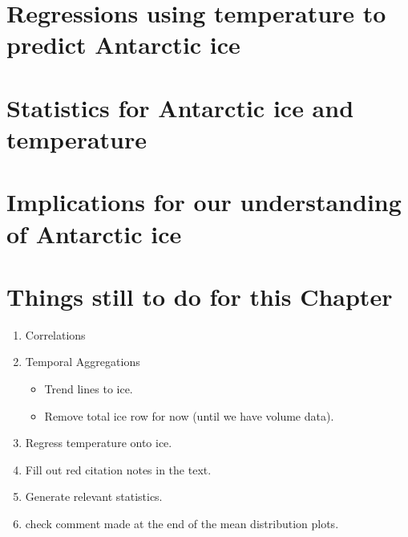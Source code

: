 \documentclass[../main.tex]{subfiles}
\begin{document}
\section[Regressions]{Regressions using temperature to predict Antarctic ice}
\label{sec:regressions_temp_ice}

\section[Statistics]{Statistics for Antarctic ice and temperature}

\section[Implications]{Implications for our understanding of Antarctic ice          }

\pagebreak
\section*{Things still to do for this Chapter}
\begin{enumerate}
    \item Correlations
    \item Temporal Aggregations
    \begin{itemize}
        \item Trend lines to ice.
        \item Remove total ice row for now (until we have volume data).
    \end{itemize}
    \item Regress temperature onto ice.
    \item Fill out red citation notes in the text.
    \item Generate relevant statistics.
    \item check comment made at the end of the mean distribution plots.
\end{enumerate}
\end{document}
